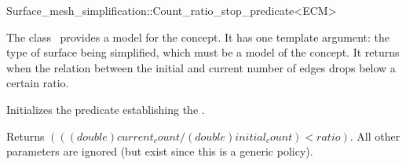 

\begin{ccRefFunctionObjectClass}{Surface_mesh_simplification::Count_ratio_stop_predicate<ECM>}


\ccDefinition

The class \ccRefName\ provides a model for the  concept.
It has one template argument: the type of surface being simplified,
which must be a model of the  concept.
It returns  when the relation between the initial and current number 
of edges drops below a certain ratio.


\ccIsModel
{}

\ccCreation
{}  %

{Initializes the predicate establishing the .} 

\ccOperations
\ccTagFullDeclarations
{}  %

  {Returns $( ((double)current_count / (double)initial_count) < ratio)$. 
  All other parameters are ignored (but exist since this is a generic policy).}

\ccSeeAlso
{}

\end{ccRefFunctionObjectClass}


